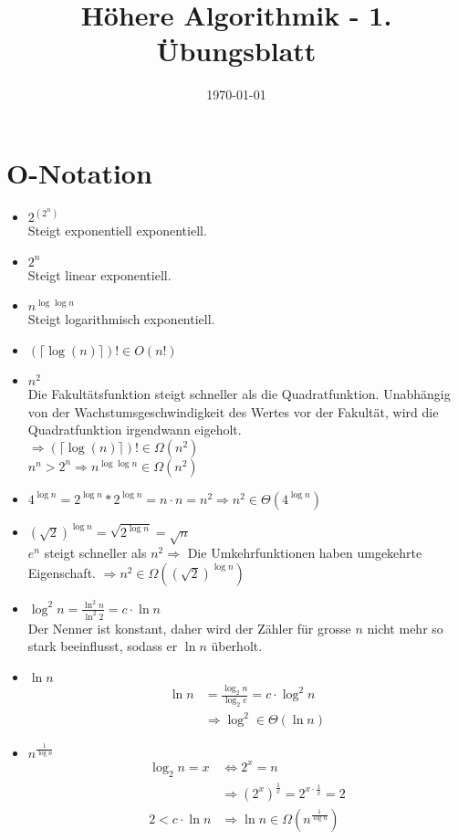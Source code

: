 \documentclass[a4paper,10pt]{scrartcl}
\title{H\"ohere Algorithmik - 1. \"Ubungsblatt}
\author{\Authors}
\date{\today}
\begin{document}
\maketitle

\section{$\boldsymbol{O}$-Notation}
\begin{itemize}
	\item $2^{(2^n)}$\\
		Steigt exponentiell exponentiell.
	\item $2^n$\\
		Steigt linear exponentiell.
	\item $n^{\log \log n}$\\
		Steigt logarithmisch exponentiell.
	\item $(\lceil \log (n) \rceil )! \in O(n!)$
	\item $n^2$\\
		Die Fakult\"atsfunktion steigt schneller als die Quadratfunktion. Unabh\"angig von der Wachstumsgeschwindigkeit des Wertes vor der Fakult\"at, wird die Quadratfunktion irgendwann eigeholt.\\
		$\Rightarrow  (\lceil \log (n) \rceil )! \in \Omega(n^2)$\\
		$n^n > 2^n \Rightarrow n^{\log \log n} \in \Omega(n^2)$
	\item $4^{\log n} = 2^{\log n} * 2^{\log n} = n \cdot n = n^2 \Rightarrow n^2 \in \Theta(4^{\log n})$\\
	\item $(\sqrt{2})^{\log n} = \sqrt{2^{\log n}} = \sqrt{n}$\\
		$e^{n}$ steigt schneller als $n^2 \Rightarrow$ Die Umkehrfunktionen haben umgekehrte Eigenschaft. $\Rightarrow n^2 \in \Omega((\sqrt{2})^{\log n})$
	\item $\log^2 n = \frac{\ln^2 n}{\ln^2 2} = c \cdot \ln n$\\
		Der Nenner ist konstant, daher wird der Z\"ahler f\"ur grosse $n$ nicht mehr so stark beeinflusst, sodass er $\ln n$ \"uberholt.
	\item $\ln n$\\
		\begin{align*}
		\ln n &= \frac{\log_2 n}{\log_2 e} = c \cdot \log^2 n\\
		&\Rightarrow \log^2 \in \Theta(\ln n)
		\end{align*}
	\item $n^{\frac{1}{\log n}}$
		\begin{align*}
		\log_2 n = x &\Leftrightarrow 2^x = n\\
		&\Rightarrow (2^x)^{\frac{1}{x}} = 2^{x \cdot \frac{1}{x}} = 2 \tag{Konstant} \\
		2 < c \cdot \ln n &\Rightarrow \ln n \in \Omega(n^{\frac{1}{\log n}})
		\end{align*}
\end{itemize}
\end{document}
